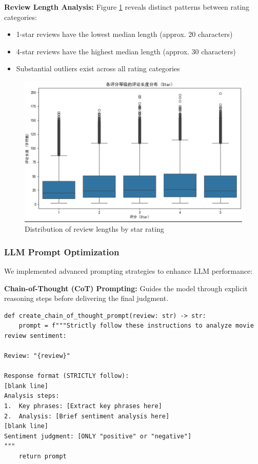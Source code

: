 \documentclass{article}
\begin{document}
\textbf{Review Length Analysis:} 
Figure \ref{fig:length_analysis} reveals distinct patterns between rating categories:
\begin{itemize}
    \item 1-star reviews have the lowest median length (approx. 20 characters)
    \item 4-star reviews have the highest median length (approx. 30 characters)
    \item Substantial outliers exist across all rating categories
\end{itemize}

\begin{figure}[h]
    \centering
    \includegraphics[width=1\columnwidth]{pic/T2P2B1.3.png}
    \caption{Distribution of review lengths by star rating}
    \label{fig:length_analysis}
\end{figure}

\subsubsection{LLM Prompt Optimization}
\label{sssec:prompt_optimization}

We implemented advanced prompting strategies to enhance LLM performance:

\textbf{Chain-of-Thought (CoT) Prompting:}
Guides the model through explicit reasoning steps before delivering the final judgment.

\begin{lstlisting}[caption={Chain-of-Thought prompt design}]
def create_chain_of_thought_prompt(review: str) -> str:
    prompt = f"""Strictly follow these instructions to analyze movie review sentiment:

Review: "{review}"

Response format (STRICTLY follow):
[blank line]
Analysis steps:
1.  Key phrases: [Extract key phrases here]
2.  Analysis: [Brief sentiment analysis here]
[blank line]
Sentiment judgment: [ONLY "positive" or "negative"]
"""
    return prompt
\end{lstlisting}
\end{document}
